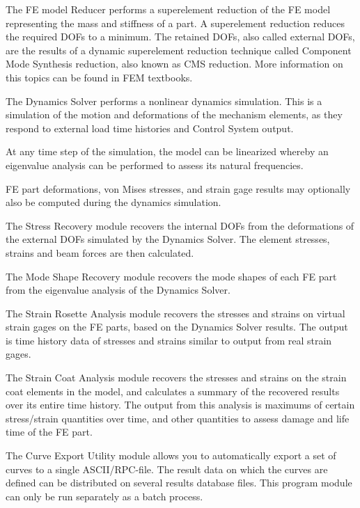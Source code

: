 
The FE model Reducer performs a superelement reduction of the FE model
representing the mass and stiffness of a part. A superelement reduction
reduces the required DOFs to a minimum. The retained DOFs, also called
external DOFs, are the results of a dynamic superelement reduction
technique called Component Mode Synthesis reduction, also known as CMS
reduction.
More information on this topics can be found in FEM textbooks.



The Dynamics Solver performs a nonlinear dynamics simulation.
This is a simulation of the motion and deformations of the mechanism elements,
as they respond to external load time histories and Control System output.

At any time step of the simulation, the model can be linearized whereby
an eigenvalue analysis can be performed to assess its natural frequencies.

FE part deformations, von Mises stresses, and strain gage results may
optionally also be computed during the dynamics simulation.



The Stress Recovery module recovers the internal DOFs from the
deformations of the external DOFs simulated by the Dynamics Solver.
The element stresses, strains and beam forces are then calculated.



The Mode Shape Recovery module recovers the mode shapes of each FE part
from the eigenvalue analysis of the Dynamics Solver.



The Strain Rosette Analysis module recovers the stresses and strains on
virtual strain gages on the FE parts, based on the Dynamics Solver results.
The output is time history data of stresses and strains similar to output
from real strain gages.



The Strain Coat Analysis module recovers the stresses and strains on the
strain coat elements in the model, and calculates a summary of the
recovered results over its entire time history. The output from this
analysis is maximums of certain stress/strain quantities over time,
and other quantities to assess damage and life time of the FE part.



The Curve Export Utility module allows you to automatically export a set
of curves to a single ASCII/RPC-file. The result data on which the
curves are defined can be distributed on several results database files.
This program module can only be run separately as a batch process.
